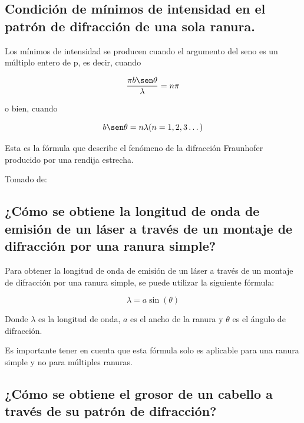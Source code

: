 \documentclass[twocolumn, 12pt]{article}
\begin{document}
\subsection{Condición de mínimos de intensidad en el patrón de difracción de una sola ranura.}

Los mínimos de intensidad se producen cuando el argumento
del seno es un múltiplo entero de p, es decir, cuando

\begin{equation*}
    \frac{\pi b \sen \theta}{\lambda} = n \pi
\end{equation*}

o bien, cuando

\begin{equation*}
    b \sen \theta = n \lambda (n = 1, 2, 3 \dots)
\end{equation*}

Esta es la fórmula que describe el fenómeno de la
difracción Fraunhofer producido por una rendija estrecha.

Tomado de:~\cite{difraccion}

\subsection{¿Cómo se obtiene la longitud de onda de emisión de un láser a través de un montaje de
    difracción por una ranura simple?}

Para obtener la longitud de onda de emisión de un láser a
través de un montaje de difracción por una ranura simple,
se puede utilizar la siguiente fórmula:

\begin{equation*}
    \lambda = a \sin(\theta)
\end{equation*}

Donde $\lambda$ es la longitud de onda, $a$ es el ancho de
la ranura y $\theta$ es el ángulo de difracción.

Es importante tener en cuenta que esta fórmula solo es
aplicable para una ranura simple y no para múltiples
ranuras.

\nocite{Multipleslitdiffraction}

\subsection{¿Cómo se obtiene el grosor de un cabello a través de su patrón de difracción?}
\end{document}
